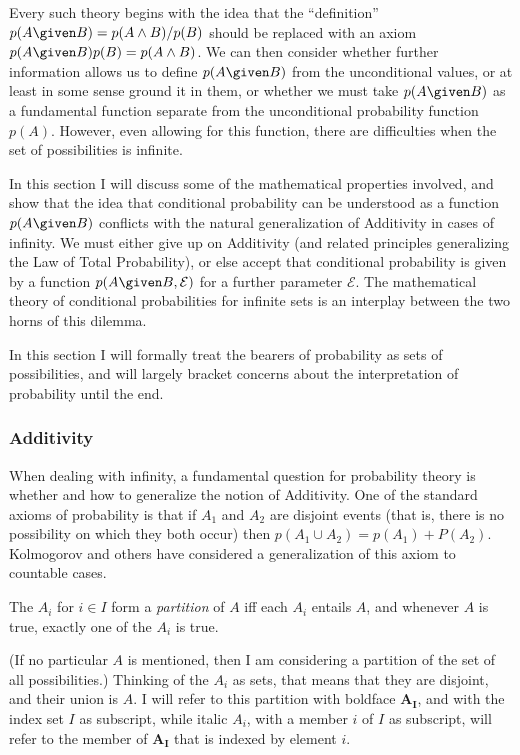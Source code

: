 Every such theory begins with the idea that the ``definition'' ${p(A \given B)}=p(A\land B)/p(B)$ should be replaced with an axiom $p(A \given B)p(B)={p(A\land B)}$. We can then consider whether further information allows us to define $p(A \given B)$ from the unconditional values, or at least in some sense ground it in them, or whether we must take $p(A \given B)$ as a fundamental function separate from the unconditional probability function $p(A)$. However, even allowing for this function, there are difficulties when the set of possibilities is infinite.

In this section I will discuss some of the mathematical properties involved, and show that the idea that conditional probability can be understood as a function $p(A \given B)$ conflicts with the natural generalization of Additivity in cases of infinity. We must either give up on Additivity (and related principles generalizing the Law of Total Probability), or else accept that conditional probability is given by a function $p(A \given B,\mathcal{E})$ for a further parameter $\mathcal{E}$. The mathematical theory of conditional probabilities for infinite sets is an interplay between the two horns of this dilemma.

In this section I will formally treat the bearers of probability as sets of possibilities, and will largely bracket concerns about the interpretation of probability until the end.

\subsubsection{Additivity}

When dealing with infinity, a fundamental question for probability theory is whether and how to generalize the notion of Additivity. One of the standard axioms of probability is that if $A_1$ and $A_2$ are disjoint events (that is, there is no possibility on which they both occur) then $p(A_1\cup A_2)=p(A_1)+P(A_2)$. Kolmogorov and others have considered a generalization of this axiom to countable cases.

\begin{definition}The $A_i$ for $i\in I$ form a \emph{partition} of $A$ iff each $A_i$ entails $A$, and whenever $A$ is true, exactly one of the $A_i$ is true.\end{definition} (If no particular $A$ is mentioned, then I am considering a partition of the set of all possibilities.) Thinking of the $A_i$ as sets, that means that they are disjoint, and their union is $A$. I will refer to this partition with boldface $\mathbf{A_I}$, and with the index set $I$ as subscript, while italic $A_i$, with a member $i$ of $I$ as subscript, will refer to the member of $\mathbf{A_I}$ that is indexed by element $i$.

